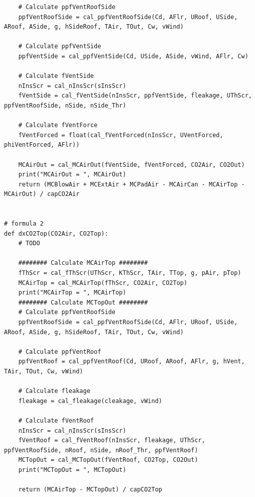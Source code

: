 \documentclass[a4paper]{article}
\begin{document}
\begin{verbatim}
    # Calculate ppfVentRoofSide
    ppfVentRoofSide = cal_ppfVentRoofSide(Cd, AFlr, URoof, USide, ARoof, ASide, g, hSideRoof, TAir, TOut, Cw, vWind)

    # Calculate ppfVentSide
    ppfVentSide = cal_ppfVentSide(Cd, USide, ASide, vWind, AFlr, Cw)

    # Calculate fVentSide
    nInsScr = cal_nInsScr(sInsScr)
    fVentSide = cal_fVentSide(nInsScr, ppfVentSide, fleakage, UThScr, ppfVentRoofSide, nSide, nSide_Thr)

    # Calculate fVentForce
    fVentForced = float(cal_fVentForced(nInsScr, UVentForced, phiVentForced, AFlr))

    MCAirOut = cal_MCAirOut(fVentSide, fVentForced, CO2Air, CO2Out)
    print("MCAirOut = ", MCAirOut)
    return (MCBlowAir + MCExtAir + MCPadAir - MCAirCan - MCAirTop - MCAirOut) / capCO2Air


# formula 2
def dxCO2Top(CO2Air, CO2Top):
    # TODO

    ######## Calculate MCAirTop ########
    fThScr = cal_fThScr(UThScr, KThScr, TAir, TTop, g, pAir, pTop)
    MCAirTop = cal_MCAirTop(fThScr, CO2Air, CO2Top)
    print("MCAirTop = ", MCAirTop)
    ######## Calculate MCTopOut ########
    # Calculate ppfVentRoofSide
    ppfVentRoofSide = cal_ppfVentRoofSide(Cd, AFlr, URoof, USide, ARoof, ASide, g, hSideRoof, TAir, TOut, Cw, vWind)

    # Calculate ppfVentRoof
    ppfVentRoof = cal_ppfVentRoof(Cd, URoof, ARoof, AFlr, g, hVent, TAir, TOut, Cw, vWind)

    # Calculate fleakage
    fleakage = cal_fleakage(cleakage, vWind)

    # Calculate fVentRoof
    nInsScr = cal_nInsScr(sInsScr)
    fVentRoof = cal_fVentRoof(nInsScr, fleakage, UThScr, ppfVentRoofSide, nRoof, nSide, nRoof_Thr, ppfVentRoof)
    MCTopOut = cal_MCTopOut(fVentRoof, CO2Top, CO2Out)
    print("MCTopOut = ", MCTopOut)

    return (MCAirTop - MCTopOut) / capCO2Top

\end{verbatim}
\end{document}
